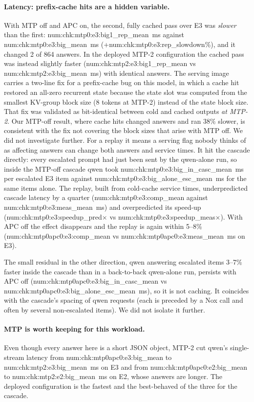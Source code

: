 \documentclass[11pt]{article}
\newcommand{\N}[1]{\csname num:#1\endcsname}
\begin{document}
\paragraph{Latency: prefix-cache hits are a hidden variable.} With MTP off and APC on, the second,
fully cached pass over E3 was \emph{slower} than the first: \N{chk:mtp0:e3:big1_rep_mean}~ms
against \N{chk:mtp0:e3:big_mean}~ms (+\N{chk:mtp0:e3:rep_slowdown}\%), and it changed 2 of 864
answers. In the deployed MTP-2 configuration the cached pass was instead slightly faster
(\N{chk:mtp2:e3:big1_rep_mean} vs \N{chk:mtp2:e3:big_mean}~ms) with identical answers. The serving image carries a two-line fix for a prefix-cache
bug on this model, in which a cache hit restored an all-zero recurrent state because the state slot was
computed from the smallest KV-group block size (8 tokens at MTP-2) instead of the state block size.
That fix was validated as bit-identical between cold and cached outputs \emph{at MTP-2}. Our MTP-off
result, where cache hits changed answers and ran 38\% slower, is consistent with the fix not covering
the block sizes that arise with MTP off. We did not investigate further. For a replay it means a
serving flag nobody thinks of as affecting answers can change both answers and service times. It hit the cascade directly: every escalated prompt had just been
sent by the qwen-alone run, so inside the MTP-off cascade qwen took
\N{chk:mtp0:e3:big_in_casc_mean}~ms per escalated E3 item against
\N{chk:mtp0:e3:big_alone_esc_mean}~ms for the same items alone. The replay, built from cold-cache
service times, underpredicted cascade latency by a quarter (\N{chk:mtp0:e3:comp_mean} against
\N{chk:mtp0:e3:meas_mean}~ms) and overpredicted its speed-up (\N{chk:mtp0:e3:speedup_pred}$\times$
vs \N{chk:mtp0:e3:speedup_meas}$\times$). With APC off the effect disappears and the replay is again
within 5--8\% (\N{chk:mtp0apc0:e3:comp_mean} vs \N{chk:mtp0apc0:e3:meas_mean}~ms on E3).

The small residual in the other direction, qwen answering escalated items 3--7\% faster inside the
cascade than in a back-to-back qwen-alone run, persists with APC off
(\N{chk:mtp0apc0:e3:big_in_casc_mean} vs \N{chk:mtp0apc0:e3:big_alone_esc_mean}~ms), so it is not
caching. It coincides with the cascade's spacing of qwen requests (each is preceded by a Nox call
and often by several non-escalated items). We did not isolate it further.

\paragraph{MTP is worth keeping for this workload.} Even though every answer here is a short JSON
object, MTP-2 cut qwen's single-stream latency from \N{chk:mtp0apc0:e3:big_mean} to
\N{chk:mtp2:e3:big_mean}~ms on E3 and from \N{chk:mtp0apc0:e2:big_mean} to
\N{chk:mtp2:e2:big_mean}~ms on E2, whose answers are longer. The deployed configuration is the
fastest and the best-behaved of the three for the cascade.
\end{document}
